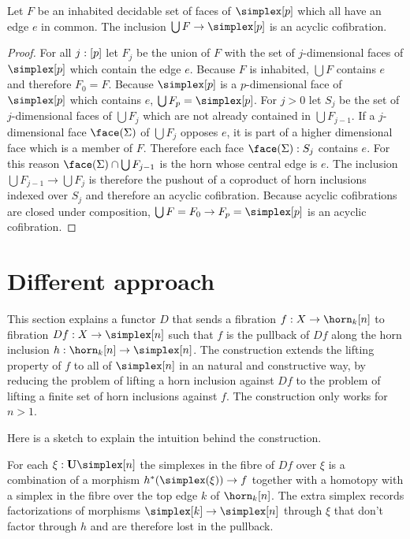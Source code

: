 \begin{lemma} Let $F$ be an inhabited decidable set of faces of $\simplex[p]$ which all have an edge $e$ in common. The inclusion $\bigcup F\to \simplex[p]$ is an acyclic cofibration. \label{face completion} \end{lemma}

\begin{proof} For all $j:[p]$ let $F_j$ be the union of $F$ with the set of $j$-dimensional faces of $\simplex[p]$ which contain the edge $e$. Because $F$ is inhabited, $\bigcup F$ contains $e$ and therefore $F_0=F$. Because $\simplex[p]$ is a $p$-dimensional face of $\simplex[p]$ which contains $e$, $\bigcup F_p = \simplex[p]$. For $j>0$ let $S_j$ be the set of $j$-dimensional faces of $\bigcup F_j$ which are not already contained in $\bigcup F_{j-1}$. If a $j$-dimensional face $\face(\Sigma)$ of $\bigcup F_j$ opposes $e$, it is part of a higher dimensional face which is a member of $F$. Therefore each face $\face(\Sigma)\of S_j$ contains $e$. For this reason $\face(\Sigma)\cap \bigcup F_{j-1}$ is the horn whose central edge is $e$. The inclusion $\bigcup F_{j-1}\to\bigcup F_j$ is therefore the pushout of a coproduct of horn inclusions indexed over $S_j$ and therefore an acyclic cofibration. Because acyclic cofibrations are closed under composition, $\bigcup F = F_0\to F_p = \simplex[p]$ is an acyclic cofibration. 
\end{proof}


\section{Different approach}
This section explains a functor $D$ that sends a fibration $f:X\to \horn_k[n]$ to fibration $Df:X\to\simplex[n]$ such that $f$ is the pullback of $Df$ along the horn inclusion $h\of\horn_k[n]\to\simplex[n]$. The construction extends the lifting property of $f$ to all of $\simplex[n]$ in an natural and constructive way, by reducing the problem of lifting a horn inclusion against $Df$ to the problem of lifting a finite set of horn inclusions against $f$. The construction only works for $n>1$. 

Here is a sketch to explain the intuition behind the construction.

For each $\xi\of \base\simplex[n]$ the simplexes in the fibre of $Df$ over $\xi$ is a combination of a morphism $h\ri(\simplex(\xi))\to f$ together with a homotopy with a simplex in the fibre over the top edge $k$ of $\horn_k[n]$. The extra simplex records factorizations of morphisms $\simplex[k]\to \simplex[n]$ through $\xi$ that don't factor through $h$ and are therefore lost in the pullback.

